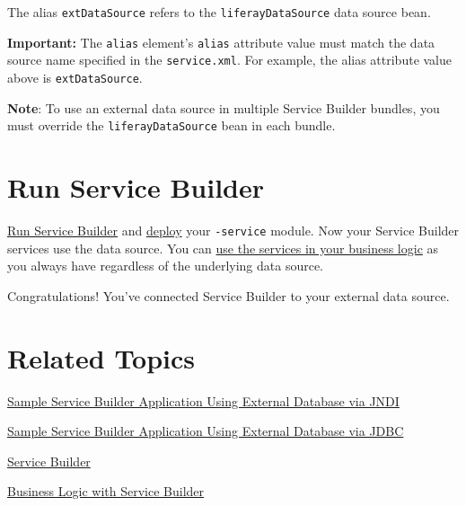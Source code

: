 The alias \texttt{extDataSource} refers to the
\texttt{liferayDataSource} data source bean.

\noindent\hrulefill

\textbf{Important:} The \texttt{alias} element's \texttt{alias}
attribute value must match the data source name specified in the
\texttt{service.xml}. For example, the alias attribute value above is
\texttt{extDataSource}.

\noindent\hrulefill

\noindent\hrulefill

\textbf{Note}: To use an external data source in multiple Service
Builder bundles, you must override the \texttt{liferayDataSource} bean
in each bundle.

\noindent\hrulefill

\section{Run Service Builder}\label{run-service-builder}

\href{/docs/7-2/appdev/-/knowledge_base/a/running-service-builder}{Run
Service Builder} and
\href{/docs/7-2/reference/-/knowledge_base/r/deploying-a-project}{deploy}
your \texttt{-service} module. Now your Service Builder services use the
data source. You can
\href{/docs/7-2/appdev/-/knowledge_base/a/business-logic-with-service-builder}{use
the services in your business logic} as you always have regardless of
the underlying data source.

Congratulations! You've connected Service Builder to your external data
source.

\section{Related Topics}\label{related-topics-16}

\href{/docs/7-2/reference/-/knowledge_base/r/service-builder-application-using-external-database-via-jndi}{Sample
Service Builder Application Using External Database via JNDI}

\href{/docs/7-2/reference/-/knowledge_base/r/service-builder-application-using-external-database-via-jdbc}{Sample
Service Builder Application Using External Database via JDBC}

\href{/docs/7-2/appdev/-/knowledge_base/a/service-builder}{Service
Builder}

\href{/docs/7-2/appdev/-/knowledge_base/a/business-logic-with-service-builder}{Business
Logic with Service Builder}

